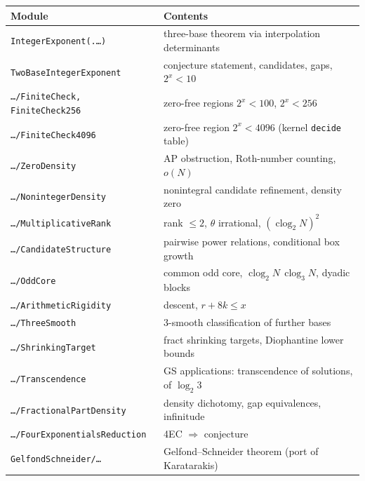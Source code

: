 \documentclass[11pt]{article}
\theoremstyle{definition}
\theoremstyle{remark}
\newcommand{\thetaq}{\theta}
\newcommand{\leanin}[1]{{\footnotesize\texttt{#1}}}
\newcommand{\clog}{\operatorname{clog}}
\begin{document}
\begin{center}
\small
\begin{tabular}{@{}ll@{}}
\toprule
Module & Contents \\
\midrule
\leanin{IntegerExponent(.{\ldots})} & three-base theorem via interpolation determinants \\
\leanin{TwoBaseIntegerExponent} & conjecture statement, candidates, gaps, $2^x<10$ \\
\leanin{{\ldots}/FiniteCheck, FiniteCheck256} & zero-free regions $2^x<100$, $2^x<256$ \\
\leanin{{\ldots}/FiniteCheck4096} & zero-free region $2^x<4096$ (kernel \leanin{decide} table) \\
\leanin{{\ldots}/ZeroDensity} & AP obstruction, Roth-number counting, $o(N)$ \\
\leanin{{\ldots}/NonintegerDensity} & nonintegral candidate refinement, density zero \\
\leanin{{\ldots}/MultiplicativeRank} & rank $\le 2$, $\thetaq$ irrational, $(\clog_2 N)^2$ \\
\leanin{{\ldots}/CandidateStructure} & pairwise power relations, conditional box growth \\
\leanin{{\ldots}/OddCore} & common odd core, $\clog_2 N\,\clog_3 N$, dyadic blocks \\
\leanin{{\ldots}/ArithmeticRigidity} & descent, $r+8k\le x$ \\
\leanin{{\ldots}/ThreeSmooth} & $3$-smooth classification of further bases \\
\leanin{{\ldots}/ShrinkingTarget} & fract shrinking targets, Diophantine lower bounds \\
\leanin{{\ldots}/Transcendence} & GS applications: transcendence of solutions, of $\log_2 3$ \\
\leanin{{\ldots}/FractionalPartDensity} & density dichotomy, gap equivalences, infinitude \\
\leanin{{\ldots}/FourExponentialsReduction} & 4EC $\Rightarrow$ conjecture \\
\leanin{GelfondSchneider/{\ldots}} & Gelfond--Schneider theorem (port of Karatarakis) \\
\bottomrule
\end{tabular}
\end{center}
\end{document}
